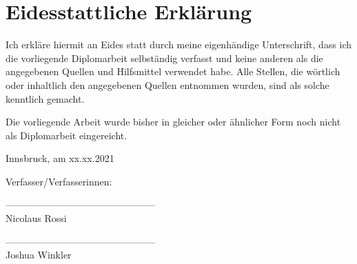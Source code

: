 \section*{Eidesstattliche Erklärung}

Ich erkläre hiermit an Eides statt durch meine eigenhändige Unterschrift, dass ich die vorliegende Diplomarbeit selbständig verfasst und keine anderen als die angegebenen Quellen und Hilfsmittel verwendet habe. Alle Stellen, die wörtlich oder inhaltlich den angegebenen Quellen entnommen wurden, sind als solche kenntlich gemacht.

Die vorliegende Arbeit wurde bisher in gleicher oder ähnlicher Form noch nicht als Diplomarbeit eingereicht.

Innsbruck, am xx.xx.2021

\vspace*{3cm}



Verfasser/Verfasserinnen:

\vspace*{2cm}


-----------------------------------------------\\
\hspace*{1.3cm}           Nicolaus Rossi

\vspace*{2cm}


-----------------------------------------------\\
\hspace*{1.3cm}           Joshua Winkler



\newpage